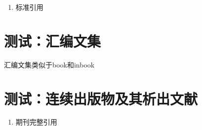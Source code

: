 \documentclass[twoside]{article}
\begin{document}
\begin{refsection}

\begin{enumerate}
  \item 标准引用\cite{国家标准局信息分类编码研究所1988-59-92,国家环境保护局科技标准司1996-2-3, 全国广播电视标准化技术委员会2007-1-1,全国文献工作标准化委员会第七分委员会1986--,全国信息文献标准化技术委员会2010-3-3, 中华人民共和国国家质量监督检验检疫总局2015,standardinfoiso158}
\end{enumerate}
\printbibliography[heading=bibliography,title=【标准】]
\end{refsection}


\section{测试：汇编文集}
\begin{refsection}
汇编文集类似于book和inbook\cite{韩吉人1985-90-99}\cite{中国职工教育研究会1985--}

{
\printbibliography%
}

\end{refsection}

\section{测试：连续出版物及其析出文献}
\begin{refsection}

\begin{enumerate}
  \item 期刊完整引用\cite{中国地质学会1936--,中国图书馆学会1957--,AAAS1883--,中华医学会湖北分会1984--}
\end{enumerate}

\printbibliography[heading=bibliography,title=【连续出版物】]
\end{refsection}
\end{document}
